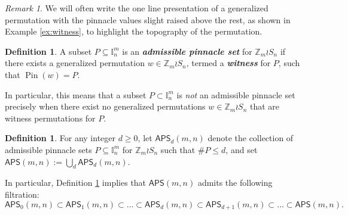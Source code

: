 \documentclass[12pt,reqno]{amsart}
\numberwithin{equation}{section}
\theoremstyle{plain}
\theoremstyle{definition}
\newtheorem{definition}[theorem]{Definition}
\theoremstyle{remark}
\newtheorem{remark}[theorem]{Remark}
\newcommand{\Z}{\mathbb{Z}}
\newcommand{\I}{\mathbb{I}}
\newcommand{\Pin}{\operatorname{Pin}}
\newcommand\APS{\mathsf{APS}}
\newcommand{\newword}[1]{\emph{\textbf{#1}}}
\begin{document}
\begin{remark}
 We will often write the one line presentation of a generalized permutation with the pinnacle values slight raised above the rest, as shown in Example \ref{ex:witness}, to highlight the topography of the permutation. 
\end{remark}

\begin{definition} A subset $P \subseteq \I_n^m$ is an \newword{admissible pinnacle set} for $\Z_m\wr S_n$ if  there exists a generalized permutation $w \in\Z_m\wr S_n$, termed a \newword{witness} for $P$, such that $\Pin(w) = P$.
\end{definition}

In particular, this means that a subset $P\subset \I_n^m$ is \emph{not} an admissible pinnacle set precisely when there exist no generalized permutations $w \in \Z_m\wr S_n$ that are witness permutations for $P$. 

\begin{definition}\label{def:APS}
For any integer $d\geq 0$, let $\APS_d(m,n)$ denote the collection of admissible pinnacle sets $P \subseteq \I_n^m$ for $ \Z_m \wr S_n$ such that $\#P \leq d$, and set $\APS(m,n) := \bigcup_d \APS_d(m,n)$.
\end{definition}

In particular, Definition \ref{def:APS} implies that $\APS(m,n)$ admits the following filtration:
\begin{equation}\label{eq:APSfiltration}
\APS_0(m,n) \subset \APS_1(m,n) \subset\dots \subset \APS_d(m,n)\subset \APS_{d+1}(m,n)\subset \dots \subset \APS(m,n).
\end{equation}
\end{document}
